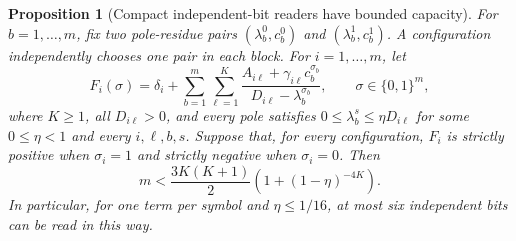 \documentclass[11pt]{article}
\newtheorem{proposition}{Proposition}
\begin{document}
\begin{proposition}[Compact independent-bit readers have bounded capacity]
For $b=1,\ldots,m$, fix two pole-residue pairs
$(\lambda_b^0,c_b^0)$ and $(\lambda_b^1,c_b^1)$.
A configuration independently chooses one pair in each block.
For $i=1,\ldots,m$, let
\[
 F_i(\sigma)=\delta_i+\sum_{b=1}^m\sum_{\ell=1}^K
 \frac{A_{i\ell}+\gamma_{i\ell}c_b^{\sigma_b}}
      {D_{i\ell}-\lambda_b^{\sigma_b}},
 \qquad \sigma\in\{0,1\}^m,
\]
where $K\geq1$, all $D_{i\ell}>0$, and every pole satisfies
$0\leq\lambda_b^s\leq\eta D_{i\ell}$ for some $0\leq\eta<1$ and
every $i,\ell,b,s$. Suppose that, for every configuration, $F_i$ is
strictly positive when $\sigma_i=1$ and strictly negative when
$\sigma_i=0$. Then
\[
 m<\frac{3K(K+1)}2
       \left(1+(1-\eta)^{-4K}\right).
\]
In particular, for one term per symbol and $\eta\leq1/16$,
at most six independent bits can be read in this way.
\end{proposition}
\end{document}
